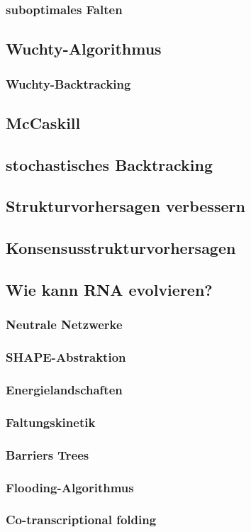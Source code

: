 \documentclass[12pt]{article}
\begin{document}
\subsubsection{suboptimales Falten}

\subsection{Wuchty-Algorithmus}

\subsubsection{Wuchty-Backtracking}

\subsection{McCaskill}

\subsection{stochastisches Backtracking}

\subsection{Strukturvorhersagen verbessern}

\subsection{Konsensusstrukturvorhersagen}

\subsection{Wie kann RNA evolvieren?}

\subsubsection{Neutrale Netzwerke}

\subsubsection{SHAPE-Abstraktion}

\subsubsection{Energielandschaften}

\subsubsection{Faltungskinetik}

\subsubsection{Barriers Trees}

\subsubsection{Flooding-Algorithmus}

\subsubsection{Co-transcriptional folding}
\end{document}

